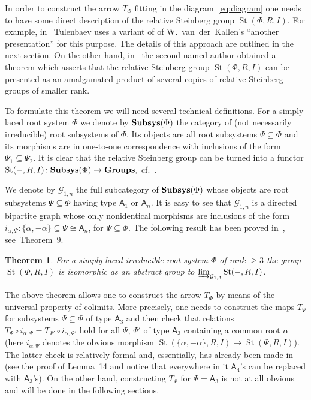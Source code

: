 \documentclass[11pt]{amsart}
\theoremstyle{plain} \declaretheorem[name=Theorem, Refname={Theorem,Theorems}]{tm} \Crefname{tm}{Theorem}{Theorems}
\numberwithin{equation}{section}
\newtheorem*{tm*}{Theorem}
\theoremstyle{definition} \newtheorem{df}[lm]{Definition} \Crefname{df}{Definition}{Definitions}
\theoremstyle{remark} \newtheorem{rk}[lm]{Remark} \Crefname{rk}{Remark}{Remarks}
\newcommand{\St}{\mathop{\mathrm{St}}\nolimits}
\newcommand{\rA}{\mathsf{A}}
\newcommand{\catname}[1]{{\normalfont\textbf{#1}}}
\begin{document}
In order to construct the arrow $T_\Phi$ fitting in the diagram~\eqref{eq:diagram} one needs to have some direct description of the relative Steinberg group $\St(\Phi, R, I)$.
For example, in~\cite{Tul} Tulenbaev uses a variant of of W.~van~der~Kallen's ``another presentation'' for this purpose. The details of this approach are outlined in the next section.
On the other hand, in~\cite{SCh} the second-named author obtained a theorem which asserts that the relative Steinberg group $\St(\Phi, R, I)$ can be presented as an amalgamated product of
several copies of relative Steinberg groups of smaller rank. 

To formulate this theorem we will need several technical definitions.
For a simply laced root system $\Phi$ we denote by $\catname{Subsys}(\Phi)$ the category of (not necessarily irreducible) root subsystems of $\Phi$.
Its objects are all root subsystems $\Psi\subseteq \Phi$ and its morphisms are in one-to-one correspondence with inclusions of the form $\Psi_1\subseteq \Psi_2$.
It is clear that the relative Steinberg group can be turned into a functor $\St(-, R, I)\colon \catname{Subsys}(\Phi) \rightarrow\catname{Groups},$ cf.~\cite[Lemma~6]{SCh}.

We denote by $\mathcal{G}_{1,n}$ the full subcategory of $\catname{Subsys}(\Phi)$ whose objects are root subsystems $\Psi\subseteq \Phi$ having type $\rA_1$ or $\rA_n$. 
It is easy to see that $\mathcal{G}_{1,n}$ is a directed bipartite graph whose only nonidentical morphisms are inclusions of the form $i_{\alpha, \Psi}\colon \{\alpha, -\alpha\} \subseteq \Psi \cong \rA_n$, for $\Psi \subseteq \Phi$.
The following result has been proved in~\cite{SCh}, see~Theorem~9.
\begin{tm*} \label{tm:relPres} For a simply laced irreducible root system $\Phi$ of rank $\geq 3$
the group $\St(\Phi, R, I)$ is isomorphic as an abstract group to $\varinjlim_{\mathcal{G}_{1,3}}\St(-, R, I)$. \end{tm*}

The above theorem allows one to construct the arrow $T_\Phi$ by means of the universal property of colimits.
More precisely, one needs to construct the maps $T_{\Psi}$ for subsystems $\Psi\subseteq\Phi$ of type $\rA_3$ and then check that
relations $T_\Psi \circ i_{\alpha, \Psi} = T_{\Psi'} \circ i_{\alpha, \Psi'}$ hold for all $\Psi$, $\Psi'$ of type $\rA_3$ containing a common root $\alpha$
(here $i_{\alpha, \Psi}$ denotes the obvious morphism $\St(\{\alpha, -\alpha\}, R, I) \to \St(\Psi, R, I)$).
The latter check is relatively formal and, essentially, has already been made in~\cite{SCh} 
(see the proof of Lemma~14 and notice that everywhere in it $\rA_4$'s can be replaced with $\rA_3$'s).
On the other hand, constructing $T_\Psi$ for $\Psi=\rA_3$ is not at all obvious and will be done in the following sections.
\end{document}
